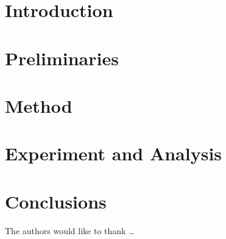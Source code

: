 \section{Introduction}\label{sec-intro}

\section{Preliminaries} \label{sec-preliminaries}

\section{Method} \label{sec-method}

\section{Experiment and Analysis} \label{sec-experiment}

\section{Conclusions} \label{sec-conclusions}


The authors would like to thank \ldots

